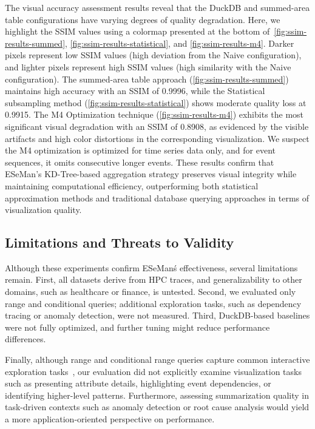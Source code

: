 \begin{refsection}
The visual accuracy assessment results reveal that the DuckDB and summed-area table configurations have varying degrees of quality degradation. Here, we highlight the SSIM values using a colormap presented at the bottom of~\autoref{fig:ssim-results-summed}, \autoref{fig:ssim-results-statistical}, and \autoref{fig:ssim-results-m4}. Darker pixels represent low SSIM values (high deviation from the Naive configuration), and lighter pixels represent high SSIM values (high similarity with the Naive configuration). The summed-area table approach (\autoref{fig:ssim-results-summed}) maintains high accuracy with an SSIM of 0.9996, while the Statistical subsampling method (\autoref{fig:ssim-results-statistical}) shows moderate quality loss at 0.9915. The M4 Optimization technique (\autoref{fig:ssim-results-m4}) exhibits the most significant visual degradation with an SSIM of 0.8908, as evidenced by the visible artifacts and high color distortions in the corresponding visualization. We suspect the M4 optimization is optimized for time series data only, and for event sequences, it omits consecutive longer events. These results confirm that ESeMan's KD-Tree-based aggregation strategy preserves visual integrity while maintaining computational efficiency, outperforming both statistical approximation methods and traditional database querying approaches in terms of visualization quality.

\subsection{Limitations and Threats to Validity}
Although these experiments confirm ESeMan\'s effectiveness, several limitations remain. First, all datasets derive from HPC traces, and generalizability to other domains, such as healthcare or finance, is untested. Second, we evaluated only range and conditional queries; additional exploration tasks, such as dependency tracing or anomaly detection, were not measured. Third, DuckDB-based baselines were not fully optimized, and further tuning might reduce performance differences.

Finally, although range and conditional range queries capture common interactive exploration tasks~\cite{sakin2024gantttaxonomy}, our evaluation did not explicitly examine visualization tasks such as presenting attribute details, highlighting event dependencies, or identifying higher-level patterns. Furthermore, assessing summarization quality in task-driven contexts such as anomaly detection or root cause analysis would yield a more application-oriented perspective on performance.



\end{refsection}
